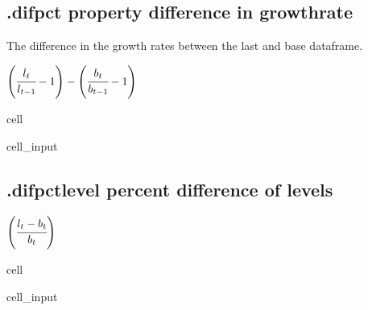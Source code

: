 \documentclass[letterpaper,10pt,english]{jupyterBook}
\begin{document}
\subsection{.difpct property difference in growthrate}
\label{\detokenize{content/notebooks/modelflow_features:difpct-property-difference-in-growthrate}}
\sphinxAtStartPar
The difference in the growth rates  between the last and base dataframe.

\sphinxAtStartPar
\(\left( \cfrac{l_t}{l_{t-1}}-1 \right) - \left(\cfrac{b_t}{b_{t-1}}-1 \right)\)

\begin{sphinxuseclass}{cell}\begin{sphinxVerbatimInput}

\begin{sphinxuseclass}{cell_input}
\begin{sphinxVerbatim}[commandchars=\\\{\}]
\PYG{p}{[}\PYG{p}{]}  
\end{sphinxVerbatim}

\end{sphinxuseclass}\end{sphinxVerbatimInput}

\end{sphinxuseclass}

\subsection{.difpctlevel percent difference of  levels}
\label{\detokenize{content/notebooks/modelflow_features:difpctlevel-percent-difference-of-levels}}
\sphinxAtStartPar
\(\left( \cfrac{l_t-b_t}{b_{t}} \right) \)

\begin{sphinxuseclass}{cell}\begin{sphinxVerbatimInput}

\begin{sphinxuseclass}{cell_input}
\begin{sphinxVerbatim}[commandchars=\\\{\}]
\PYG{p}{[}\PYG{p}{]}  
\end{sphinxVerbatim}

\end{sphinxuseclass}\end{sphinxVerbatimInput}

\end{sphinxuseclass}
\end{document}
